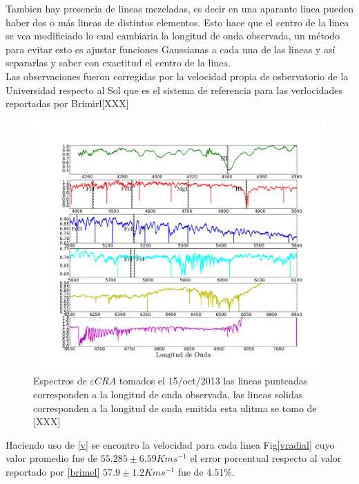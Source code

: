 \documentclass[Proceedings]{ascelike}
\begin{document}
Tambien hay presencia de lineas mezcladas, es decir en una aparante linea pueden haber dos o m\'as lineas de distintos 
elementos. Esto hace que el centro de la linea se vea modificiado lo cual cambiaria la longitud de onda observada, 
un m\'etodo para evitar esto es ajustar funciones Gaussianas a cada una de las lineas y as\'i separarlas y saber con exactitud el centro de la linea.\\ 

Las observaciones fueron corregidas por la velocidad propia de osbervatorio de la Universidad respecto al Sol que es el sistema de referencia para las verlocidades reportadas por Brimirl[XXX] 

\begin{figure}
\includegraphics[scale=0.3]{spectra.png}
\caption{Espectros de $\varepsilon CRA$ tomados el 15/oct/2013
las lineas punteadas corresponden a la longitud de onda observada, las 
lineas solidas corresponden a la longitud de onda emitida esta ulitma se tomo de [XXX]\label{espectra}}
\end{figure}

Haciendo uso de \eqref{v} se encontro la velocidad para cada linea Fig\ref{vradial} cuyo valor promedio fue de $55.285 \pm 6.59 Km s^{-1}$ el error porcentual respecto al valor reportado por \ref{brimel} $57.9 \pm 1.2 Kms^{-1}$ fue de $4.51\%$. \\
\end{document}
